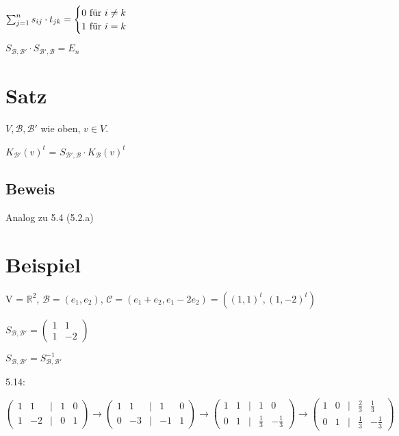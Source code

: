 \documentclass[a4paper, openany]{book}
\begin{document}
        $\sum_{j=1}^n s_{ij} \cdot t_{jk} = \begin{cases}0 \textnormal{ für $i \neq k$} \\ 1 \textnormal{ für $i = k$} \end{cases}$

        \begin{center}
          $S_{\mathcal{B, B'}} \cdot S_{\mathcal{B', B}} = E_n$
        \end{center}

        \section{Satz}

        $V, \mathcal{B, B'}$ wie oben, $v \in V$. 

        $K_{\mathcal{B'}}(v)^t$ = $S_{\mathcal{B', B}} \cdot K_{\mathcal{B}}(v)^t$

        \subsection{Beweis}

        Analog zu 5.4 (5.2.a)

        \section{Beispiel}

        V = $\mathbb{R}^2$, $\mathcal{B} = (e_1, e_2)$, $\mathcal{C} = (e_1 + e_2, e_1-2e_2) = ((1,1)^t, (1,-2)^t)$

        \par \medskip
        \par \medskip

        $S_{\mathcal{B, B'}} = \begin{pmatrix}1 & 1 \\ 1 & -2 \end{pmatrix}$

        \par \medskip
        \par \medskip

        $S_{\mathcal{B, B'}} = S_{\mathcal{B, B'}}^{-1}$

        5.14:

        $\begin{pmatrix}1 & 1 & | & 1 & 0 \\ 1 & -2 & | & 0 & 1 \end{pmatrix} \rightarrow \begin{pmatrix}1 & 1 & | & 1 & 0 \\ 0 & -3 & | & -1 & 1 \end{pmatrix} \rightarrow \begin{pmatrix}1 & 1 & | & 1 & 0 \\ 0 & 1 & | & \frac{1}{3} & - \frac{1}{3} \end{pmatrix} \rightarrow \begin{pmatrix}1 & 0 & | & \frac{2}{3} & \frac{1}{3} \\ 0 & 1 & | & \frac{1}{3} & - \frac{1}{3} \end{pmatrix}$
\end{document}
